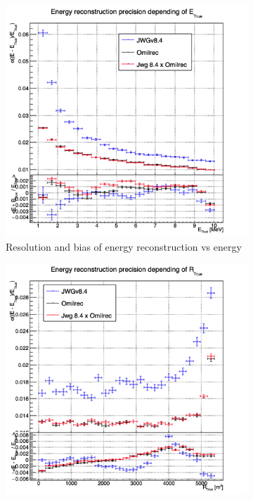 \documentclass[../main.tex]{subfiles}
\begin{document}
\begin{figure}[ht]
  \centering
  \begin{subfigure}[t]{0.32\linewidth}
    \centering
    \includegraphics[width=\linewidth]{images/jgnn/MSBvTE.png}
    \caption{Resolution and bias of energy reconstruction vs energy}
    \label{fig:jgnn:MESBvETC}
  \end{subfigure}
  \begin{subfigure}[t]{0.32\linewidth}
    \centering
    \includegraphics[width=\linewidth]{images/jgnn/MESBvRT.png}

\end{subfigure}
\end{figure}
\end{document}
